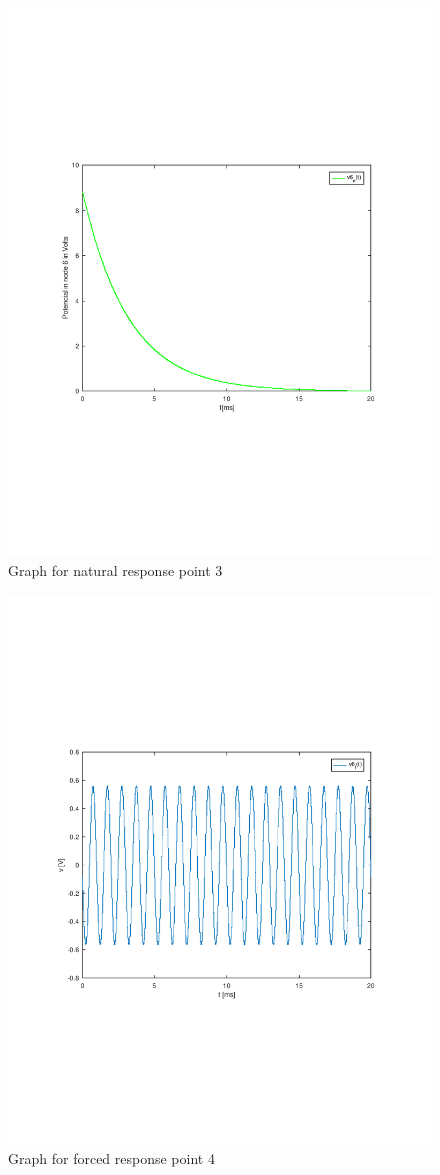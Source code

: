 \begin{figure}[h] \centering
\includegraphics[width=0.9\linewidth]{natural_tab.pdf}
\caption{Graph for natural response point 3}
\label{fig:natural}
\end{figure}

\begin{figure}[h] \centering
\includegraphics[width=0.9\linewidth]{vs_v6_f_tab.pdf}
\caption{Graph for forced response point 4}
\label{fig:vs_v6_f}
\end{figure}

